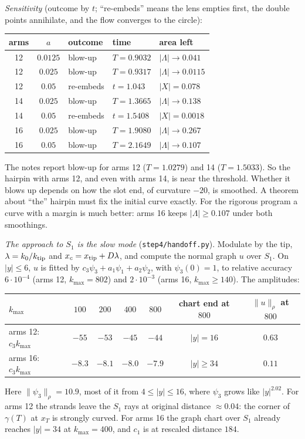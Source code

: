 \documentclass[11pt]{amsart}
\theoremstyle{remark}
\begin{document}
\emph{Sensitivity} (outcome by $t$; ``re-embeds'' means the lens empties first, the double points annihilate, and the flow converges to the circle):
\begin{center}
\begin{tabular}{@{}cclll@{}}
\toprule
arms & $a$ & outcome & time & area left\\
\midrule
12 & $0.0125$ & blow-up & $T=0.9032$ & $|\Lambda|\to0.041$\\
12 & $0.025$ & blow-up & $T=0.9317$ & $|\Lambda|\to0.0115$\\
12 & $0.05$ & re-embeds & $t=1.043$ & $|X|=0.078$\\
14 & $0.025$ & blow-up & $T=1.3665$ & $|\Lambda|\to0.138$\\
14 & $0.05$ & re-embeds & $t=1.5408$ & $|X|=0.0018$\\
16 & $0.025$ & blow-up & $T=1.9080$ & $|\Lambda|\to0.267$\\
16 & $0.05$ & blow-up & $T=2.1649$ & $|\Lambda|\to0.107$\\
\bottomrule
\end{tabular}
\end{center}
The notes report blow-up for arms 12 ($T=1.0279$) and 14 ($T=1.5033$). So the hairpin with arms 12, and even with arms 14, is near the threshold. Whether it blows up depends on how the slot end, of curvature $-20$, is smoothed. A theorem about ``the'' hairpin must fix the initial curve exactly. For the rigorous program a curve with a margin is much better: arms 16 keeps $|\Lambda|\ge0.107$ under both smoothings.

\emph{The approach to $S_1$ is the slow mode} (\texttt{step4/handoff.py}). Modulate by the tip, $\lambda=k_0/k_{\rm tip}$ and $x_c=x_{\rm tip}+D\lambda$, and compute the normal graph $u$ over $S_1$. On $|y|\le6$, $u$ is fitted by $c_3\psi_3+a_1\psi_1+a_2\psi_2$, with $\psi_3(0)=1$, to relative accuracy $6\cdot10^{-4}$ (arms 12, $k_{\max}=802$) and $2\cdot10^{-3}$ (arms 16, $k_{\max}\ge140$). The amplitudes:
\begin{center}
\begin{tabular}{@{}lcccccc@{}}
\toprule
$k_{\max}$ & $100$ & $200$ & $400$ & $800$ & chart end at $800$ & $\|u\|_\rho$ at $800$\\
\midrule
arms 12: $c_3k_{\max}$ & $-55$ & $-53$ & $-45$ & $-44$ & $|y|=16$ & $0.63$\\
arms 16: $c_3k_{\max}$ & $-8.3$ & $-8.1$ & $-8.0$ & $-7.9$ & $|y|\ge34$ & $0.11$\\
\bottomrule
\end{tabular}
\end{center}
Here $\|\psi_3\|_\rho=10.9$, most of it from $4\le|y|\le16$, where $\psi_3$ grows like $|y|^{2.02}$. For arms 12 the strands leave the $S_1$ rays at original distance $\approx0.04$: the corner of $\gamma(T)$ at $x_T$ is strongly curved. For arms 16 the graph chart over $S_1$ already reaches $|y|=34$ at $k_{\max}=400$, and $c_1$ is at rescaled distance $184$.
\end{document}

